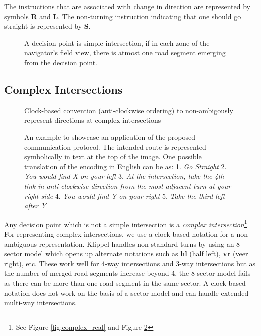 \documentclass{iitkthesis}
\begin{document}
The instructions that are associated with change in direction are 
represented by symbols \textbf{R} and \textbf{L}. The non-turning 
instruction indicating that one should go straight is represented by {\bf S}. 

\begin{figure}
\centering
\caption{A decision point is simple intersection, if in each zone of the navigator's field view, there is atmost one road segment emerging from the decision point.}
\label{fig:simpleturns}
 \end{figure}
\subsection{Complex Intersections}
\begin{figure}
\centering
\caption{Clock-based convention (anti-clockwise ordering) to non-ambigously represent directions at complex intersections}
\label{fig:complex}
 \end{figure}
\begin{figure}
\centering
\caption{An example to showcase an application of the proposed 
communication protocol. The intended route is represented symbolically in 
text at the top of the image. One possible translation of the encoding in 
English can be as: 
1. \textit{Go Straight}
2. \textit{You would find X on your left}
3. \textit{At the intersection, take the 4th link in anti-clockwise direction from the most adjacent turn at your right side} 
4. \textit{You would find Y on your right}
5. \textit{Take the third left after Y}
}
\label{fig:complexex}
 \end{figure} 
Any decision point which is not a simple intersection is a 
\textit{complex intersection}\footnote{See Figure \ref{fig:complex_real} 
and Figure \ref{fig:complex}}. For representing complex intersections, we 
use a clock-based notation for a non-ambiguous representation. Klippel 
\cite{klippel} handles non-standard turns by using an 8-sector model which 
opens up alternate notations such as \textbf{hl} (half left), 
\textbf{vr} (veer right), etc. These work well for 4-way intersections 
and 3-way intersections but as the number of merged road segments 
increase beyond 4, the 8-sector model fails as there can be more than one 
road segment in the same sector. A clock-based notation does not work on the 
basis of a sector model and can handle extended multi-way intersections.
\end{document}
